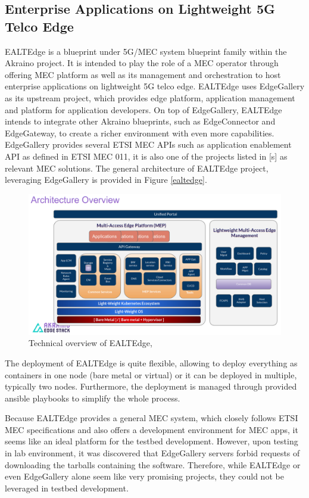 \documentclass[12pt,a4paper,twoside]{report}
\begin{document}
\subsection{Enterprise Applications on Lightweight 5G Telco Edge}
EALTEdge is a blueprint under 5G/MEC system blueprint family within the Akraino project. It is intended to play the role of a MEC operator through offering MEC platform as well as its management and orchestration to host enterprise applications on lightweight 5G telco edge. EALTEdge uses EdgeGallery as its upstream project, which provides edge platform, application management and platform for application developers. On top of EdgeGallery, EALTEdge intends to integrate other Akraino blueprints, such as EdgeConnector and EdgeGateway, to create a richer environment with even more capabilities. EdgeGallery provides several ETSI MEC APIs such as application enablement API as defined in ETSI MEC 011, it is also one of the projects listed in [s] as relevant MEC solutions. The general architecture of EALTEdge project, leveraging EdgeGallery is provided in Figure \ref{ealtedge}. \cite{ealtedge-docu}
\begin{figure}[ht]
	\centering
	\includegraphics[width=13cm]{./images/akraino-ealtedge.png}
	\caption{Technical overview of EALTEdge, \cite{ealtedge-docu}}
	\label{F:ealtedge}
\end{figure}

The deployment of EALTEdge is quite flexible, allowing to deploy everything as containers in one node (bare metal or virtual) or it can be deployed in multiple, typically two nodes. Furthermore, the deployment is managed through provided ansible playbooks to simplify the whole process.

Because EALTEdge provides a general MEC system, which closely follows ETSI MEC specifications and also offers a development environment for MEC apps, it seems like an ideal platform for the testbed development. However, upon testing in lab environment, it was discovered that EdgeGallery servers forbid requests of downloading the tarballs containing the software. Therefore, while EALTEdge or even EdgeGallery alone seem like very promising projects, they could not be leveraged in testbed development.
\end{document}
